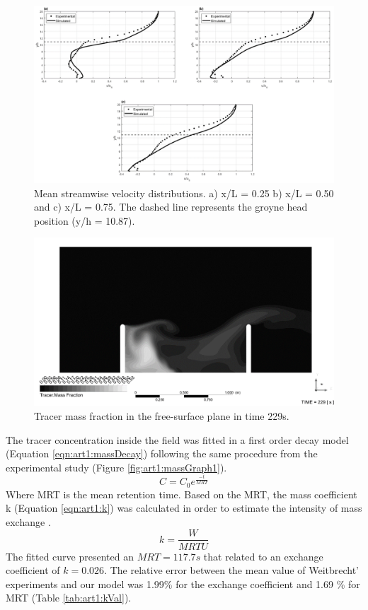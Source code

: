 \begin{figure}[!ht]
\centering
\includegraphics[width=\linewidth]{../images/art1/imgMassExchange4.png}
\caption{Mean streamwise velocity distributions. a) x/L = 0.25 b) x/L = 0.50 and c) x/L = 0.75. The dashed line represents the groyne head position (y/h = 10.87).}
\label{fig:art1:graphs}
\end{figure}
\begin{figure}[!ht]
\centering
\includegraphics[width=\linewidth]{../images/art1/imgMassExchange5.png}
\caption{Tracer mass fraction in the free-surface plane in time 229s.}
\label{fig:art1:tracerContour}
\end{figure}

The tracer concentration inside the field was fitted in a first order decay model (Equation \ref{eqn:art1:massDecay}) following the same procedure from the experimental study (Figure \ref{fig:art1:massGraph1}).
\begin{equation}
C=C_0 e^{\frac{-t}{MRT}}
\label{eqn:art1:massDecay}
\end{equation}
Where MRT is the mean retention time. Based on the MRT, the mass coefficient k (Equation \ref{eqn:art1:k}) was calculated in order to estimate the intensity of mass exchange \cite{weitbrecht2001}.
\begin{equation}
k=\frac{W}{MRT U}
\label{eqn:art1:k}
\end{equation}The fitted curve presented an $MRT = 117.7s$ that related to an exchange coefficient of $k = 0.026$. The relative error between the mean value of Weitbrecht’ experiments and our model was 1.99\% for the exchange coefficient and 1.69 \% for MRT (Table \ref{tab:art1:kVal}).

